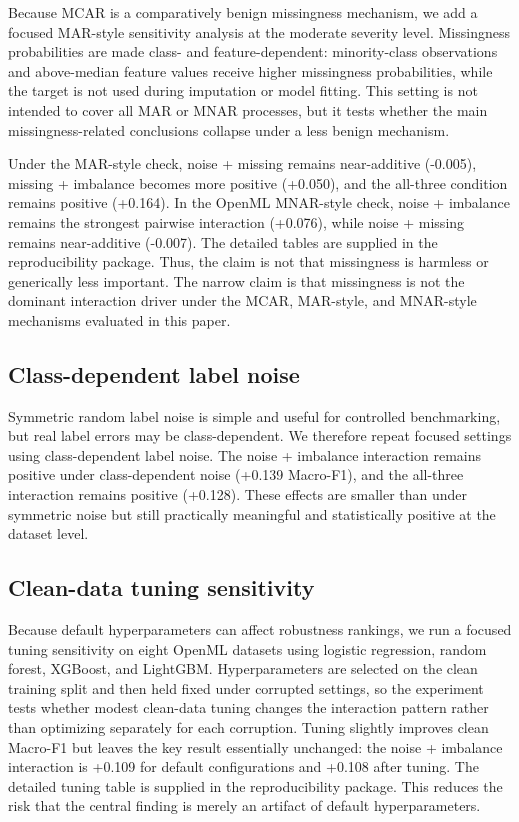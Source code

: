 \documentclass[preprint,12pt,number]{elsarticle}
\begin{document}
Because MCAR is a comparatively benign missingness mechanism, we add a focused MAR-style sensitivity analysis at the moderate severity level. Missingness probabilities are made class- and feature-dependent: minority-class observations and above-median feature values receive higher missingness probabilities, while the target is not used during imputation or model fitting. This setting is not intended to cover all MAR or MNAR processes, but it tests whether the main missingness-related conclusions collapse under a less benign mechanism.

Under the MAR-style check, noise + missing remains near-additive (-0.005), missing + imbalance becomes more positive (+0.050), and the all-three condition remains positive (+0.164). In the OpenML MNAR-style check, noise + imbalance remains the strongest pairwise interaction (+0.076), while noise + missing remains near-additive (-0.007). The detailed tables are supplied in the reproducibility package. Thus, the claim is not that missingness is harmless or generically less important. The narrow claim is that missingness is not the dominant interaction driver under the MCAR, MAR-style, and MNAR-style mechanisms evaluated in this paper.


\subsection{Class-dependent label noise}

Symmetric random label noise is simple and useful for controlled benchmarking, but real label errors may be class-dependent. We therefore repeat focused settings using class-dependent label noise. The noise + imbalance interaction remains positive under class-dependent noise (+0.139 Macro-F1), and the all-three interaction remains positive (+0.128). These effects are smaller than under symmetric noise but still practically meaningful and statistically positive at the dataset level.

\subsection{Clean-data tuning sensitivity}

Because default hyperparameters can affect robustness rankings, we run a focused tuning sensitivity on eight OpenML datasets using logistic regression, random forest, XGBoost, and LightGBM. Hyperparameters are selected on the clean training split and then held fixed under corrupted settings, so the experiment tests whether modest clean-data tuning changes the interaction pattern rather than optimizing separately for each corruption. Tuning slightly improves clean Macro-F1 but leaves the key result essentially unchanged: the noise + imbalance interaction is +0.109 for default configurations and +0.108 after tuning. The detailed tuning table is supplied in the reproducibility package. This reduces the risk that the central finding is merely an artifact of default hyperparameters.
\end{document}
